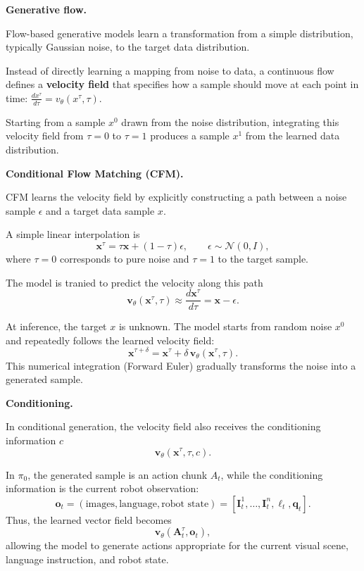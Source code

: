 \textbf{Generative flow.}
\begin{dashlist}
\item Flow-based generative models learn a transformation from a simple distribution, typically Gaussian noise, to the target data distribution.
\item Instead of directly learning a mapping from noise to data, a continuous flow defines a \textbf{velocity field} that specifies how a sample should move at each point in time:
\(            \frac{d x^\tau}{d\tau} = v_\theta(x^\tau,\tau).
       \)
\item Starting from a sample $x^0$ drawn from the noise distribution, integrating this velocity field from $\tau=0$ to $\tau=1$ produces a sample $x^1$ from the learned data distribution.
\end{dashlist}

\textbf{Conditional Flow Matching (CFM).}
\begin{dashlist}
    \item CFM learns the velocity field by explicitly constructing a path between a noise sample $\epsilon$ and a target data sample $x$.
    \item A simple linear interpolation is
    \[
        \mathbf{x}^\tau = \tau \mathbf{x} + (1-\tau)\epsilon,
        \qquad
        \epsilon \sim \mathcal{N}(0,I),
    \]
    where $\tau=0$ corresponds to pure noise and $\tau=1$ to the target sample.
    \item The model is tranied to predict the velocity along this path
    \[
        \mathbf{v}_\theta(\mathbf{x}^\tau,\tau) \approx \frac{d \mathbf{x}^\tau}{d\tau} = \mathbf{x}-\epsilon.
    \]
    \item At inference, the target $x$ is unknown. The model starts from random noise $x^0$ and repeatedly follows the learned velocity field:
    \[
        \mathbf{x}^{\tau+\delta}
        =
        \mathbf{x}^\tau
        +
        \delta\,\mathbf{v}_\theta(\mathbf{x}^\tau,\tau).
    \]
    This numerical integration (Forward Euler) gradually transforms the noise into a generated sample.
\end{dashlist}

\textbf{Conditioning.}
\begin{dashlist}
    \item In conditional generation, the velocity field also receives the conditioning information $c$
    \[
        \mathbf{v}_\theta(\mathbf{x}^\tau,\tau,c).
    \]
    \item In $\pi_0$, the generated sample is an action chunk $A_t$, while the conditioning information is the current robot observation:
    \[
        \mathbf{o}_t = (\text{images},\text{language}, \text{robot state}) = [\mathbf{I}_t^1, \dots, \mathbf{I}_t^n, \ell_t, \mathbf{q}_t].
    \]
    Thus, the learned vector field becomes
    \[
        \mathbf{v}_\theta(\mathbf{A}_t^\tau,\mathbf{o}_t),
    \]
    allowing the model to generate actions appropriate for the current visual scene, language instruction, and robot state.
\end{dashlist}

